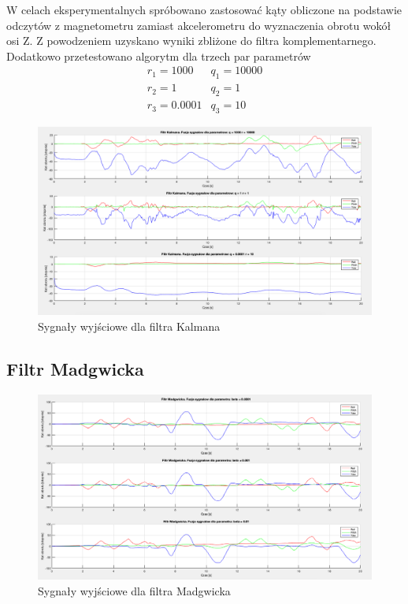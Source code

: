 W celach eksperymentalnych spróbowano zastosować kąty obliczone na podstawie odczytów z magnetometru zamiast akcelerometru do wyznaczenia obrotu wokół osi Z. Z powodzeniem uzyskano wyniki zbliżone do filtra komplementarnego. Dodatkowo przetestowano algorytm dla trzech par parametrów
$$
    \begin{array}{ll}
        r_1 = 1000 & q_1 = 10000 \\
        r_2 = 1 & q_2 = 1 \\
        r_3 = 0.0001 & q_3 = 10 
    \end{array}
$$
\begin{figure}[h!]
    \centering
    \includegraphics[width=1\textwidth]{Rysunki/Rozdzial04/Filtr_Kalmana_po.png}
    \caption{Sygnały wyjściowe dla filtra Kalmana}
    \label{Kalman po}
\end{figure}

\subsection{Filtr Madgwicka}

\begin{figure}[h!]
    \centering
    \includegraphics[width=1\textwidth]{Rysunki/Rozdzial04/Filtr_Madgwicka_po.png}
    \caption{Sygnały wyjściowe dla filtra Madgwicka}
    \label{Madgwick po}
\end{figure}

